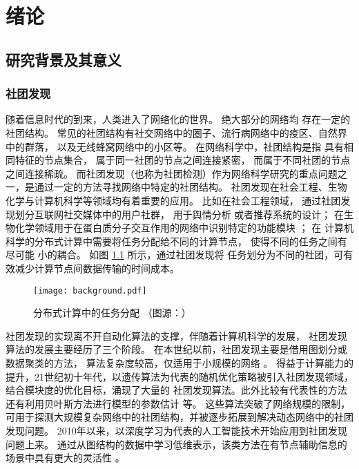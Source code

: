 
\chapter{绪论}


\section{研究背景及其意义}
\subsection{社团发现}\label{sec:community}
随着信息时代的到来，人类进入了网络化的世界。
绝大部分的网络均
存在一定的社团结构\cite{wang2012network}。
常见的社团结构有社交网络中的圈子、流行病网络中的疫区、自然界中的群落，
以及无线蜂窝网络中的小区等。
在网络科学中，社团结构是指
具有相同特征的节点集合， 属于同一社团的节点之间连接紧密，
而属于不同社团的节点之间连接稀疏。
而社团发现（也称为社团检测）作为网络科学研究的重点问题之一，是通过一定的方法寻找网络中特定的社团结构。
社团发现在社会工程、生物化学与计算机科学等领域均有着重要的应用。
比如在社会工程领域，
通过社团发现划分互联网社交媒体中的用户社群\cite{zalmout2013twitter}，
用于舆情分析\cite{yang2018opinion}
或者推荐系统的设计\cite{cao2015recommendation}；
在生物化学领域用于在蛋白质分子交互作用的网络中识别特定的功能模块 \cite{ayati2015mobas}；
在
计算机科学的分布式计算中需要将任务分配给不同的计算节点，
使得不同的任务之间有尽可能
小的耦合\cite{topcuoglu2002performance}。
如图 \ref{fig:distributed_computing} 所示，通过社团发现将
任务划分为不同的社团，可有效减少计算节点间数据传输的时间成本。

\begin{figure}[!ht]
    \centering
    \texttt{[image: background.pdf]}
    \caption{分布式计算中的任务分配 （图源：）}
    \label{fig:distributed_computing}
\end{figure}


社团发现的实现离不开自动化算法的支撑，伴随着计算机科学的发展，
社团发现算法的发展主要经历了三个阶段。
在本世纪以前，社团发现主要是借用图划分或数据聚类的方法，
算法复杂度较高，仅适用于小规模的网络 \cite{fortunato2010community}。
得益于计算能力的提升，21世纪初十年代，以遗传算法为代表的随机优化策略被引入社团发现领域，
结合模块度的优化目标，涌现了大量的
社团发现算法。此外比较有代表性的方法还有利用贝叶斯方法进行模型的参数估计 \cite{jin2023survey}
等。
这些算法突破了网络规模的限制，可用于探测大规模复杂网络中的社团结构，并被逐步拓展到解决动态网络中的社团发现问题。
2010年以来，以深度学习为代表的人工智能技术开始应用到社团发现问题上来。
通过从图结构的数据中学习低维表示，该类方法在有节点辅助信息的场景中具有更大的灵活性
\cite{Su_2022}。

